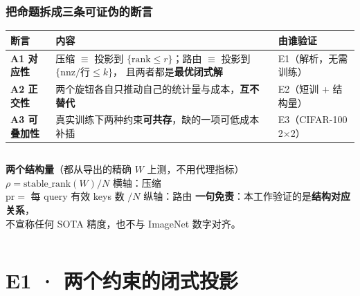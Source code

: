 \documentclass[10pt,aspectratio=169,mathserif]{beamer}
\begin{document}
\begin{frame}
\frametitle{\textbf{把命题拆成三条可证伪的断言}}
  \begin{center}
  \footnotesize
  \begin{tabular}{@{}p{2.4cm}p{6.9cm}p{3.7cm}@{}}
    \toprule
    \textbf{断言} & \textbf{内容} & \textbf{由谁验证} \\
    \midrule
    \textcolor{seugreen}{\textbf{A1 对应性}} &
    压缩 $\equiv$ 投影到 $\{\text{rank}\le r\}$；路由 $\equiv$ 投影到 $\{\mathrm{nnz}/\text{行}\le k\}$，
    且两者都是\textbf{最优闭式解} &
    E1（解析，无需训练） \\
    \addlinespace
    \textcolor{seugreen}{\textbf{A2 正交性}} &
    两个旋钮各自只推动自己的统计量与成本，\textbf{互不替代} &
    E2（短训 + 结构量） \\
    \addlinespace
    \textcolor{seugreen}{\textbf{A3 可叠加性}} &
    真实训练下两种约束\textbf{可共存}，缺的一项可低成本补插 &
    E3（CIFAR-100 2$\times$2） \\
    \bottomrule
  \end{tabular}
  \end{center}

  \vspace{0.6em}
  \begin{columns}[T]
      \footnotesize
      \textbf{两个结构量}（都从导出的精确 $W$ 上测，不用代理指标）\\[2pt]
      $\rho=\mathrm{stable\_rank}(W)/N$ \quad 横轴：压缩 \\
      $\mathrm{pr}=$ 每 query 有效 keys 数 $/N$ \quad 纵轴：路由
      \footnotesize
      \textbf{一句免责}：本工作验证的是\textbf{结构对应关系}，\\
      不宣称任何 SOTA 精度，也不与 ImageNet 数字对齐。
  \end{columns}
\end{frame}

\section[E1]{E1 · 两个约束的闭式投影}
\end{document}
